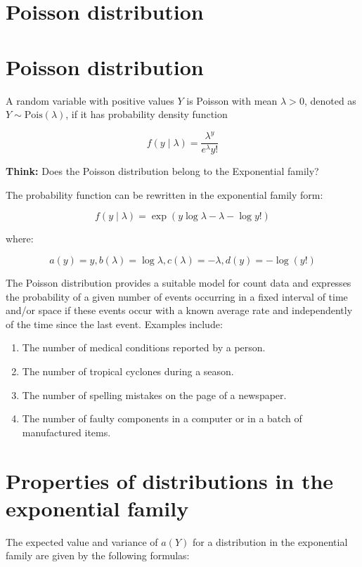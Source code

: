 \documentclass[11pt]{article}
\begin{document}
\begin{enumerate}
\section{Poisson distribution}

\section{Poisson distribution}

A random variable with positive values \(Y\) is Poisson with mean \(\lambda > 0\), denoted as \(Y \sim \text{Pois}(\lambda) \), if it has probability density function

\[f(y \mid \lambda) = \frac{\lambda^y}{e^{\lambda}y!}\]

\textbf{Think:} Does the Poisson distribution belong to the Exponential family?

The probability function can be rewritten in the exponential family form:

\[f(y \mid \lambda) = \exp\left(y \log \lambda - \lambda - \log y! \right)\]

where:

\[a(y) = y, b(\lambda) = \log \lambda, c(\lambda) = -\lambda, d(y) = -\log(y!)\]

The Poisson distribution provides a suitable model for count data and expresses the probability of a given number of events occurring in a fixed interval of time and/or space if these events occur with a known average rate and independently of the time since the last event. Examples include:

\begin{enumerate}
    \item The number of medical conditions reported by a person.
    \item The number of tropical cyclones during a season.
    \item The number of spelling mistakes on the page of a newspaper.
    \item The number of faulty components in a computer or in a batch of manufactured items.
\end{enumerate}

\section{Properties of distributions in the exponential family}

The expected value and variance of \( a(Y) \) for a distribution in the exponential family are given by the following formulas:


\end{enumerate}
\end{document}
